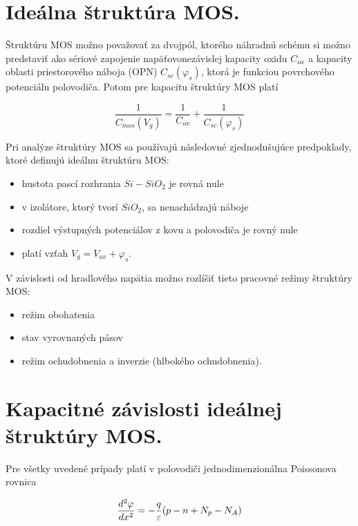 \section{Ideálna štruktúra MOS.}

Štruktúru MOS možno považovať za dvojpól, ktorého náhradnú schému si
možno predstaviť ako sériové zapojenie napäťovonezávislej kapacity
oxidu $C_{ox}$ a kapacity oblasti priestorového náboja (OPN)
$C_{sc}(\varphi_{s})$, ktorá je funkciou povrchového potenciálu
polovodiča. Potom pre kapacitu štruktúry MOS platí~\cite{I.1}

\begin{equation}\label{eq:1.1}
  \frac{1}{C_{mos}(V_g)} = \frac{1}{C_{ox}} + \frac{1}{C_{sc}(\varphi_s)}
\end{equation}

Pri analýze štruktúry MOS sa používajú následovné zjednodušujúce
predpoklady, ktoré definujú ideálnu štruktúru MOS\@:

\begin{itemize}
\item hustota pascí rozhrania $Si-SiO_2$ je rovná nule 
\item v izolátore, ktorý tvorí $SiO_2$, sa nenachádzajú náboje 
\item rozdiel výstupných potenciálov z kovu a polovodiča je rovný nule
\item platí vzťah $V_{g}=V_{ox}+\varphi_{s}$.
\end{itemize}

\noindent V závislosti od hradlového napätia možno rozlíšiť tieto
pracovné režimy štruktúry MOS\@:

\begin{itemize}
\item režim obohatenia
\item stav vyrovnaných pásov
\item režim ochudobnenia a inverzie (hlbokého ochudobnenia).
\end{itemize}

\section{Kapacitné závislosti ideálnej štruktúry MOS.}

Pre všetky uvedené prípady platí v polovodiči jednodimenzionálna
Poissonova rovnica

\begin{equation}\label{eq:1.2}\index{Poissonova rovnica}
  \frac{d^2\varphi}{dx^2} = -\frac{q}{\varepsilon}(p-n+N_{p}-N_{A})
\end{equation}

